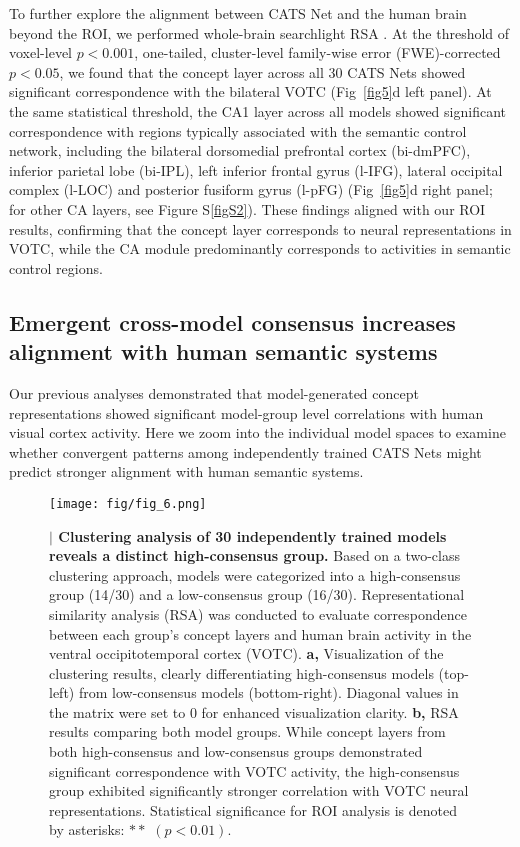 \documentclass[pdflatex,sn-mathphys-num,lineno]{sn-jnl}%
\begin{document}
\begin{CJK}{UTF8}{gbsn}
To further explore the alignment between CATS Net and the human brain beyond the ROI, we performed whole-brain searchlight RSA \cite{kriegeskorte_information-based_2006}. At the threshold of voxel-level $p < 0.001$, one-tailed, cluster-level family-wise error (FWE)-corrected $p < 0.05$, we found that the concept layer across all 30 CATS Nets showed significant correspondence with the bilateral VOTC (Fig~\ref{fig5}d left panel). At the same statistical threshold, the CA1 layer across all models showed significant correspondence with regions typically associated with the semantic control network, including the bilateral dorsomedial prefrontal cortex (bi-dmPFC), inferior parietal lobe (bi-IPL), left inferior frontal gyrus (l-IFG), lateral occipital complex (l-LOC) and posterior fusiform gyrus (l-pFG) (Fig~\ref{fig5}d right panel; for other CA layers, see Figure S\ref{figS2}). These findings aligned with our ROI results, confirming that the concept layer corresponds to neural representations in VOTC, while the CA module predominantly corresponds to activities in semantic control regions.

\subsection{Emergent cross-model consensus increases alignment with human semantic systems}
Our previous analyses demonstrated that model-generated concept representations showed significant model-group level correlations with human visual cortex activity. Here we zoom into the individual model spaces to examine whether convergent patterns among independently trained CATS Nets might predict stronger alignment with human semantic systems.

\begin{figure}[htbp]
\centering
\texttt{[image: fig/fig\_6.png]}
\caption{\textbf{$\vert$ Clustering analysis of 30 independently trained models reveals a distinct high-consensus group.} Based on a two-class clustering approach, models were categorized into a high-consensus group (14/30) and a low-consensus group (16/30). Representational similarity analysis (RSA) was conducted to evaluate correspondence between each group's concept layers and human brain activity in the ventral occipitotemporal cortex (VOTC). \textbf{a,} Visualization of the clustering results, clearly differentiating high-consensus models (top-left) from low-consensus models (bottom-right). Diagonal values in the matrix were set to 0 for enhanced visualization clarity. \textbf{b,} RSA results comparing both model groups. While concept layers from both high-consensus and low-consensus groups demonstrated significant correspondence with VOTC activity, the high-consensus group exhibited significantly stronger correlation with VOTC neural representations. Statistical significance for ROI analysis is denoted by asterisks: $**$ $(p < 0.01)$.}
\label{fig6}
\end{figure}


\end{CJK}
\end{document}
